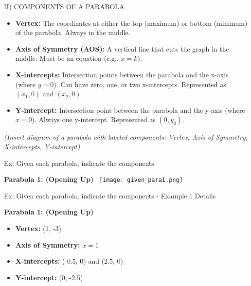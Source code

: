 \documentclass[aspectratio=169]{beamer}
\begin{document}
\begin{frame}{II) COMPONENTS OF A PARABOLA}
    \begin{tcolorbox}[colback=lightgray,colframe=primary,title=Key Components]
        \footnotesize
        \begin{itemize}
            \item \textbf{Vertex:} The coordinates at either the top (maximum) or bottom (minimum) of the parabola. Always in the middle.
            \item \textbf{Axis of Symmetry (AOS):} A vertical line that cuts the graph in the middle. Must be an equation (e.g., $x = k$).
            \item \textbf{X-intercepts:} Intersection points between the parabola and the x-axis (where $y=0$). Can have zero, one, or two x-intercepts. Represented as $(x_1, 0)$ and $(x_2, 0)$.
            \item \textbf{Y-intercept:} Intersection point between the parabola and the y-axis (where $x=0$). Always one y-intercept. Represented as $(0, y_0)$.
        \end{itemize}
        \vspace{0.5em}
        \textit{(Insert diagram of a parabola with labeled components: Vertex, Axis of Symmetry, X-intercepts, Y-intercept)}
    \end{tcolorbox}
\end{frame}

\begin{frame}{Ex: Given each parabola, indicate the components}
    \begin{tcolorbox}[colback=lightgray,colframe=primary,title=Example 1 - Graph]
        \footnotesize
        \textbf{Parabola 1: (Opening Up)}\
        \centering
        \texttt{[image: given\_para1.png]}
    \end{tcolorbox}
\end{frame}

\begin{frame}{Ex: Given each parabola, indicate the components - Example 1 Details}
    \begin{tcolorbox}[colback=lightgray,colframe=primary,title=Example 1 - Components]
        \footnotesize
        \textbf{Parabola 1: (Opening Up)}
        
        \begin{itemize}
            \item \textbf{Vertex:} (1, -3)
            \item \textbf{Axis of Symmetry:} $x = 1$
            \item \textbf{X-intercepts:} (-0.5, 0) and (2.5, 0)
            \item \textbf{Y-intercept:} (0, -2.5)
        \end{itemize}
    \end{tcolorbox}
\end{frame}
\end{document}
